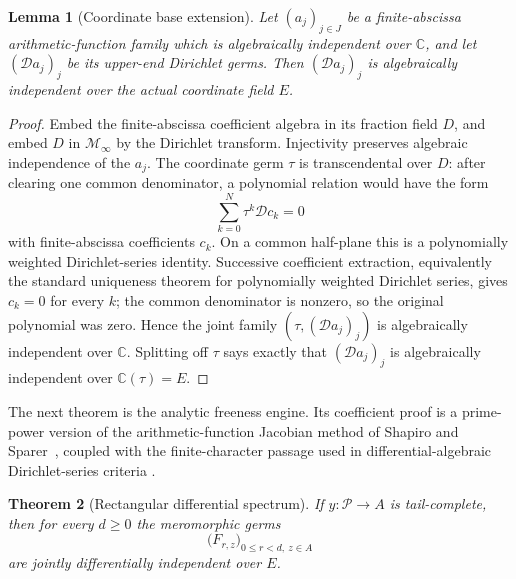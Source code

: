 \documentclass[11pt]{article}
\newtheorem{theorem}{Theorem}[section]
\newtheorem{lemma}[theorem]{Lemma}
\theoremstyle{definition}
\theoremstyle{remark}
\newcommand{\C}{\mathbb C}
\newcommand{\cM}{\mathcal M}
\newcommand{\cP}{\mathcal P}
\begin{document}
\begin{lemma}[Coordinate base extension]\label{lem:coordinate-extension}
Let \((a_j)_{j\in J}\) be a finite-abscissa arithmetic-function family which is algebraically
independent over \(\C\), and let \((\mathscr D a_j)_j\) be its upper-end Dirichlet germs.  Then
\((\mathscr D a_j)_j\) is algebraically independent over the actual coordinate field \(E\).
\end{lemma}

\begin{proof}
Embed the finite-abscissa coefficient algebra in its fraction field \(D\), and embed \(D\) in
\(\cM_\infty\) by the Dirichlet transform.  Injectivity preserves algebraic independence of the
\(a_j\).  The coordinate germ \(\tau\) is transcendental over \(D\): after clearing one common
denominator, a polynomial relation would have the form
\[
 \sum_{k=0}^N \tau^k\mathscr D c_k=0
\]
with finite-abscissa coefficients \(c_k\).  On a common half-plane this is a polynomially weighted
Dirichlet-series identity.  Successive coefficient extraction, equivalently the standard
uniqueness theorem for polynomially weighted Dirichlet series, gives \(c_k=0\) for every \(k\);
the common denominator is nonzero, so the original polynomial was zero.  Hence the joint family
\((\tau,(\mathscr D a_j)_j)\) is algebraically
independent over \(\C\).  Splitting off \(\tau\) says exactly that
\((\mathscr D a_j)_j\) is algebraically independent over
\(\C(\tau)=E\).
\end{proof}

The next theorem is the analytic freeness engine.  Its coefficient proof is a prime-power version
of the arithmetic-function Jacobian method of Shapiro and Sparer~\cite{ShapiroSparer1986}, coupled
with the finite-character passage used in differential-algebraic Dirichlet-series criteria
\cite{Pong2016}.

\begin{theorem}[Rectangular differential spectrum]\label{thm:rectangle}
If \(y:\cP\to A\) is tail-complete, then for every \(d\geq0\) the meromorphic germs
\begin{equation}\label{eq:rectangle}
 \bigl(F_{r,z}\bigr)_{0\leq r<d,\ z\in A}
\end{equation}
are jointly differentially independent over \(E\).
\end{theorem}
\end{document}
